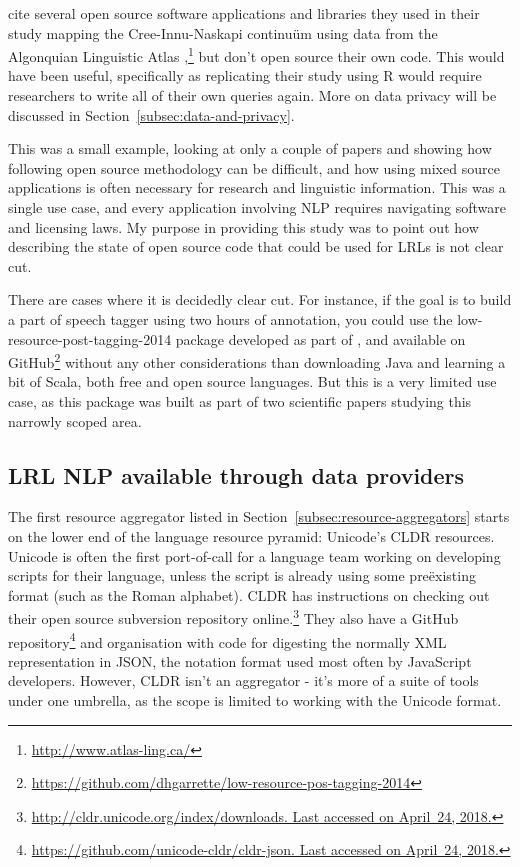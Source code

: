\citet{cenerini2017mapping} cite several open source software applications and libraries they used in their study mapping the Cree-Innu-Naskapi continu\"{u}m using data from the Algonquian Linguistic Atlas \citep{junker2011linguistic},\footnote{\href{http://www.atlas-ling.ca/}{http://www.atlas-ling.ca/}} but don't open source their own code. This would have been useful, specifically as replicating their study using R \citep{ihaka1996r} would require researchers to write all of their own queries again. More on data privacy will be discussed in Section~\ref{subsec:data-and-privacy}.

This was a small example, looking at only a couple of papers and showing how following open source methodology can be difficult, and how using mixed source applications is often necessary for research and linguistic information. This was a single use case, and every application involving NLP requires navigating software and licensing laws. My purpose in providing this study was to point out how describing the state of open source code that could be used for LRLs is not clear cut. 

There are cases where it is decidedly clear cut. For instance, if the goal is to build a part of speech tagger using two hours of annotation, you could use the low-resource-post-tagging-2014 package developed as part of \citet{garrette2013real,garrette2013learning}, and available on GitHub\footnote{\href{https://github.com/dhgarrette/low-resource-pos-tagging-2014}{https://github.com/dhgarrette/low-resource-pos-tagging-2014}} without any other considerations than downloading Java and learning a bit of Scala, both free and open source languages. But this is a very limited use case, as this package was built as part of two scientific papers studying this narrowly scoped area.

\subsection{LRL NLP available through data providers}
\label{subsec:lrl-nlp-through-providers}

The first resource aggregator listed in Section~\ref{subsec:resource-aggregators} starts on the lower end of the language resource pyramid: Unicode's CLDR resources. Unicode is often the first port-of-call for a language team working on developing scripts for their language, unless the script is already using some  pre\"{e}xisting format (such as the Roman alphabet). CLDR has instructions on checking out their open source subversion repository online.\footnote{\href{http://cldr.unicode.org/index/downloads}{http://cldr.unicode.org/index/downloads. Last accessed on April~24, 2018.}} They also have a GitHub repository\footnote{\href{https://github.com/unicode-cldr/cldr-json}{https://github.com/unicode-cldr/cldr-json. Last accessed on April~24, 2018.}} and organisation with code for digesting the normally XML representation in JSON, the notation format used most often by JavaScript developers. However, CLDR isn't an aggregator - it's more of a suite of tools under one umbrella, as the scope is limited to working with the Unicode format.

